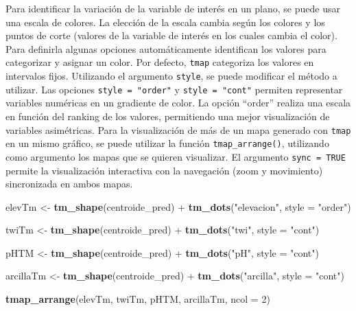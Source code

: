 \documentclass[11pt,b5paper,]{krantz}
\newenvironment{Shaded}{}{}
\newcommand{\DataTypeTok}[1]{\textcolor[rgb]{0.56,0.13,0.00}{#1}}
\newcommand{\DecValTok}[1]{\textcolor[rgb]{0.25,0.63,0.44}{#1}}
\newcommand{\KeywordTok}[1]{\textcolor[rgb]{0.00,0.44,0.13}{\textbf{#1}}}
\newcommand{\NormalTok}[1]{#1}
\newcommand{\OperatorTok}[1]{\textcolor[rgb]{0.40,0.40,0.40}{#1}}
\newcommand{\StringTok}[1]{\textcolor[rgb]{0.25,0.44,0.63}{#1}}
\begin{document}
Para identificar la variación de la variable de interés en un plano, se puede usar una escala de colores. La elección de la escala cambia según los colores y los puntos de corte (valores de la variable de interés en los cuales cambia el color). Para definirla algunas opciones automáticamente identifican los valores para categorizar y asignar un color. Por defecto, \texttt{tmap} categoriza los valores en intervalos fijos. Utilizando el argumento \texttt{style}, se puede modificar el método a utilizar. Las opciones \texttt{style\ =\ "order"} y \texttt{style\ =\ "cont"} permiten representar variables numéricas en un gradiente de color. La opción ``order'' realiza una escala en función del ranking de los valores, permitiendo una mejor visualización de variables asimétricas. Para la visualización de más de un mapa generado con \texttt{tmap} en un mismo gráfico, se puede utilizar la función \texttt{tmap\_arrange()}, utilizando como argumento los mapas que se quieren visualizar. El argumento \texttt{sync\ =\ TRUE} permite la visualización interactiva con la navegación (zoom y movimiento) sincronizada en ambos mapas.

\begin{Shaded}
\begin{Highlighting}[]
\NormalTok{elevTm <-}\StringTok{ }\KeywordTok{tm_shape}\NormalTok{(centroide_pred) }\OperatorTok{+}
\StringTok{  }\KeywordTok{tm_dots}\NormalTok{(}\StringTok{"elevacion"}\NormalTok{, }\DataTypeTok{style =} \StringTok{"order"}\NormalTok{)}

\NormalTok{twiTm <-}\StringTok{ }\KeywordTok{tm_shape}\NormalTok{(centroide_pred) }\OperatorTok{+}
\StringTok{  }\KeywordTok{tm_dots}\NormalTok{(}\StringTok{"twi"}\NormalTok{, }\DataTypeTok{style =} \StringTok{"cont"}\NormalTok{)}

\NormalTok{pHTM <-}\StringTok{ }\KeywordTok{tm_shape}\NormalTok{(centroide_pred) }\OperatorTok{+}
\StringTok{  }\KeywordTok{tm_dots}\NormalTok{(}\StringTok{"pH"}\NormalTok{, }\DataTypeTok{style =} \StringTok{"cont"}\NormalTok{)}

\NormalTok{arcillaTm <-}\StringTok{ }\KeywordTok{tm_shape}\NormalTok{(centroide_pred) }\OperatorTok{+}
\StringTok{  }\KeywordTok{tm_dots}\NormalTok{(}\StringTok{"arcilla"}\NormalTok{, }\DataTypeTok{style =} \StringTok{"cont"}\NormalTok{)}

\KeywordTok{tmap_arrange}\NormalTok{(elevTm, twiTm, pHTM, arcillaTm, }
             \DataTypeTok{ncol =} \DecValTok{2}\NormalTok{)}
\end{Highlighting}
\end{Shaded}
\end{document}
